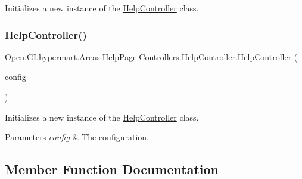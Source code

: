 Initializes a new instance of the \hyperlink{class_open_1_1_g_i_1_1hypermart_1_1_areas_1_1_help_page_1_1_controllers_1_1_help_controller}{Help\+Controller} class. 

\hypertarget{class_open_1_1_g_i_1_1hypermart_1_1_areas_1_1_help_page_1_1_controllers_1_1_help_controller_a5701fb0613147c92bcf47b40636fbb4c}{}\label{class_open_1_1_g_i_1_1hypermart_1_1_areas_1_1_help_page_1_1_controllers_1_1_help_controller_a5701fb0613147c92bcf47b40636fbb4c} 
\subsubsection{\texorpdfstring{Help\+Controller()}{HelpController()}\hspace{0.1cm}{\footnotesize\ttfamily [2/2]}}
{\footnotesize\ttfamily Open.\+G\+I.\+hypermart.\+Areas.\+Help\+Page.\+Controllers.\+Help\+Controller.\+Help\+Controller (\begin{DoxyParamCaption}\item[{Http\+Configuration}]{config }\end{DoxyParamCaption})}



Initializes a new instance of the \hyperlink{class_open_1_1_g_i_1_1hypermart_1_1_areas_1_1_help_page_1_1_controllers_1_1_help_controller}{Help\+Controller} class. 


\begin{DoxyParams}{Parameters}
{\em config} & The configuration.\\
\hline
\end{DoxyParams}


\subsection{Member Function Documentation}
\hypertarget{class_open_1_1_g_i_1_1hypermart_1_1_areas_1_1_help_page_1_1_controllers_1_1_help_controller_a5f4e23a5d390343976a5b04f7a3e9344}{}\label{class_open_1_1_g_i_1_1hypermart_1_1_areas_1_1_help_page_1_1_controllers_1_1_help_controller_a5f4e23a5d390343976a5b04f7a3e9344} 
